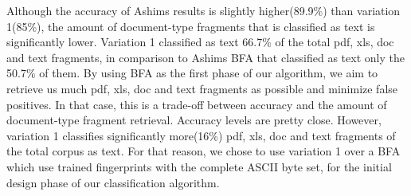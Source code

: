  Although the accuracy of Ashims results is slightly higher(89.9\%) than variation 1(85\%), the amount of document-type fragments that is classified as text is significantly lower. Variation 1 classified as text 66.7\% of the total pdf, xls, doc and text fragments, in comparison to Ashims BFA that classified as text only the 50.7\% of them. By using BFA as the first phase of our algorithm, we aim to retrieve us much pdf, xls, doc and text fragments as possible and minimize false positives. In that case, this is a trade-off between accuracy and the amount of document-type fragment retrieval. Accuracy levels are pretty close. However, variation 1 classifies significantly more(16\%) pdf, xls, doc and text fragments of the total corpus as text. For that reason, we chose to use variation 1 over a BFA which use trained fingerprints with the complete ASCII byte set, for the initial design phase of our classification algorithm.
 
 

